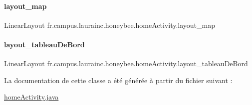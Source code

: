 \paragraph{\texorpdfstring{layout\+\_\+map}{layout\_map}}
{\footnotesize\ttfamily Linear\+Layout fr.\+campus.\+laurainc.\+honeybee.\+home\+Activity.\+layout\+\_\+map\hspace{0.3cm}{\ttfamily [private]}}

\mbox{\label{classfr_1_1campus_1_1laurainc_1_1honeybee_1_1home_activity_add46240b2690229c03b49cffa3ba76bb}} 
\paragraph{\texorpdfstring{layout\+\_\+tableau\+De\+Bord}{layout\_tableauDeBord}}
{\footnotesize\ttfamily Linear\+Layout fr.\+campus.\+laurainc.\+honeybee.\+home\+Activity.\+layout\+\_\+tableau\+De\+Bord\hspace{0.3cm}{\ttfamily [private]}}



La documentation de cette classe a été générée à partir du fichier suivant \+:\begin{DoxyCompactItemize}
\item 
\hyperlink{home_activity_8java}{home\+Activity.\+java}\end{DoxyCompactItemize}
